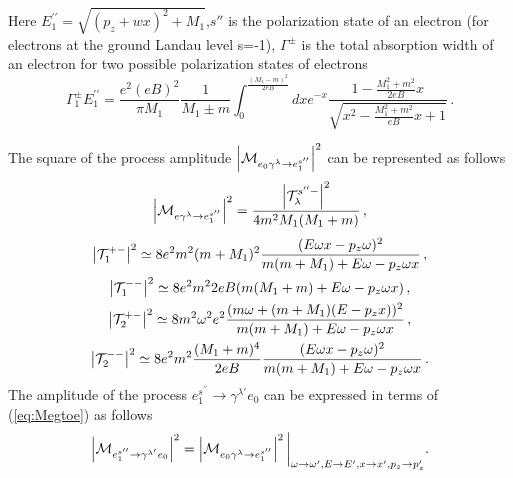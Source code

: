 \documentclass[
aps,%
12pt,%
final,%
notitlepage,%
oneside,%
onecolumn,%
nobibnotes,%
nofootinbib,%
superscriptaddress,%
noshowpacs,%
centertags]%
{revtex4}
\begin{document}
Here $E_1^{\prime\prime}=\sqrt{(p_z+wx)^2+M_1}$,$s''$ is the polarization state of an electron (for electrons at the ground Landau level s=-1), $\Gamma^\pm$ is the total absorption width of an electron for two possible polarization states of electrons \cite{KM_Book_2003}
\begin{equation}
	\Gamma^{\pm}_1
	E_1^{\prime\prime}=\frac{e^2(eB)^2}{\pi M_1}{\frac{1}{M_1\pm m}}\int_{0}^{\frac{(M_1-m)^2}{2eB}}dx e^{-x} \frac{1-\frac{M_1^2+m^2}{2eB}x}{\sqrt{x^2-\frac{M_1^2+m^2}{eB}x+1}}\, .
\end{equation}

The square of the process amplitude $\left|{\cal M}_{e_0\gamma^\lambda\to e^{s^{\prime\prime}}_1}\right|^2$ can be represented as follows \cite{YarkovJETP:2017}
\begin{equation}\label{eq:Megtoe}
	\left|{\cal M}_{e\gamma^\lambda\to e^{s''}_1}\right|^2 = \frac{\left|{\cal T} ^{s'' -}_\lambda\right|^2}{4m^2M_1(M_1+m)}\, ,
\end{equation}
\begin{equation}
	\begin{gathered}
		\left|{\cal T} ^{+ -}_1\right|^2\simeq8e^2  m^2(m+M_1)^2\frac{(E\omega x-p_z \omega)^2}{m(m+M_1)+E\omega-p_z\omega x}\, ,
		\\
		\left|{\cal T} ^{- -}_1\right|^2\simeq8 e^2 m^2 2eB   (m (M_1 +m) +E\omega-p_z\omega x)\, ,
		\\
		\left|{\cal T} ^{+ -}_2\right|^2\simeq8 m^2\omega^2 e^2  \frac{(m\omega+(m+M_1)(E-p_zx))^2}{m(m+M_1)+E\omega-p_z\omega x} \, ,
		\\
	\left|{\cal T} ^{- -}_2\right|^2\simeq8e^2 m^2 \frac{(M_1+m)^4}{2eB}\frac{(E\omega x - p_z\omega )^2}{m(m+M_1)+E\omega-p_z\omega x}\, .
	\end{gathered}
\end{equation}
The amplitude of the process $e^{s^{\prime\prime}}_1
\to\gamma^{\lambda'}e_0$ can be expressed in terms of (\ref{eq:Megtoe}) as follows
\begin{equation}
\left|{\cal
	M}_{e^{s^{\prime\prime}}_1
	\to\gamma^{\lambda'}e_0}\right|^2=\left|{\cal M}_{e_0\gamma^\lambda\to e^{s^{\prime\prime}}_1}\right|^2\bigg|_{\omega\to\omega',E\to E', x\to x',p_z\to p'_z}.
\end{equation}

\end{document}

